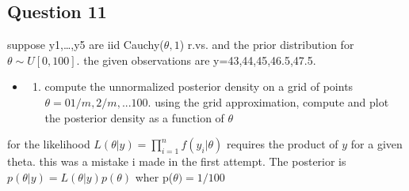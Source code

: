 \documentclass[
]{book}
\providecommand{\tightlist}{%
  \setlength{\itemsep}{0pt}\setlength{\parskip}{0pt}}
\theoremstyle{definition}
\theoremstyle{definition}
\theoremstyle{definition}
\theoremstyle{definition}
\theoremstyle{remark}
\begin{document}
\hypertarget{question-11}{%
\subsection*{Question 11}\label{question-11}}

suppose y1,\ldots,y5 are iid Cauchy(\(\theta,1\)) r.vs. and the prior distribution for\(\theta \sim U[0,100]\). the given observations are y=43,44,45,46.5,47.5.

\begin{itemize}
\item
  \begin{enumerate}
  \def\labelenumi{(\alph{enumi})}
  \tightlist
  \item
    compute the unnormalized posterior density on a grid of points \(\theta=0 1/m, 2/m, ... 100\). using the grid approximation, compute and plot the posterior density as a function of \(\theta\)
  \end{enumerate}
\end{itemize}

for the likelihood \(L(\theta | y) = \prod_{i=1}^n f(y_i|\theta)\) requires the product of \(y\) for a given theta. this was a mistake i made in the first attempt. The posterior is \(p(\theta|y) = L(\theta |y)p(\theta)\) wher p(\(\theta)= 1/100\)
\end{document}
